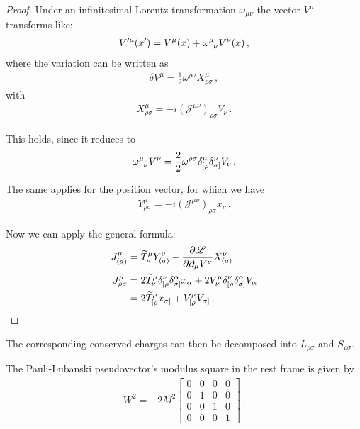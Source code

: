 \documentclass[main.tex]{subfiles}
\begin{document}
\begin{proof}
Under an infinitesimal Lorentz transformation \(\omega_{\mu \nu }\) the vector \(V^{\mu } \) transforms like: 
%
\begin{align}
V^{\prime \mu }(x') = V^{\mu } (x) + \tensor{\omega }{^{\mu }_{\nu }} V^{\nu }(x)
\,,
\end{align}
%
where the variation can be written as 
%
\begin{align}
\delta V^{\mu } = \frac{1}{2} \omega^{\rho \sigma } X^{\mu }_{\rho \sigma }
\,,
\end{align}
%
with 
%
\begin{align}
X^{\mu }_{\rho \sigma } = -i (\mathscr{J}^{\mu \nu })_{\rho \sigma } V_{\nu }
\,.
\end{align}

This holds, since it reduces to 
%
\begin{align}
\tensor{\omega }{^{\mu }_{\nu }} V^{\nu } = \frac{2}{2} \omega^{\rho \sigma } \delta^{\mu }_{[\rho } \delta^{\nu }_{\sigma ]} V_{\nu }
\,.
\end{align}

The same applies for the position vector, for which we have 
%
\begin{align}
Y^{\mu }_{\rho \sigma } = -i (\mathscr{J}^{\mu \nu })_{ \rho \sigma } x_{\nu }
\,.
\end{align}

Now we can apply the general formula: 
%
\begin{align}
J^{\mu }_{(a)} &= \widetilde{T}^{\mu }_{\nu } Y^{\nu }_{(a)} - \pdv{\mathscr{L}}{\partial_{\mu } V^{\nu }} X_{(a)}^{\nu }  \\
J^{\mu }_{\rho \sigma }&= 2\widetilde{T}^{\mu }_{\nu  } \delta^{\nu  }_{[\rho  } \delta^{\alpha }_{\sigma ]} x_{\alpha } 
+ 2 V^{\mu}_{\nu } \delta^{\nu}_{[\rho } \delta^{\alpha }_{\sigma ]} V_{\alpha }  \\
&= 2\widetilde{T}^{\mu }_{[\rho } x_{\sigma ]}
+ V^{\mu }_{[\rho } V_{\sigma ]}
\,.
\end{align}
\end{proof}

The corresponding conserved charges can then be decomposed into \(L_{\rho \sigma } \) and \(S_{\rho \sigma }\). 

\begin{claim}
The Pauli-Lubanski pseudovector's modulus square in the rest frame is given by 
%
\begin{align}
W^2 = -2 M^2 \left[\begin{array}{cccc}
0 & 0 & 0 & 0 \\ 
0 & 1 & 0 & 0 \\ 
0 & 0 & 1 & 0 \\ 
0 & 0 & 0 & 1
\end{array}\right]
\,.
\end{align}
\end{claim}
\end{document}
